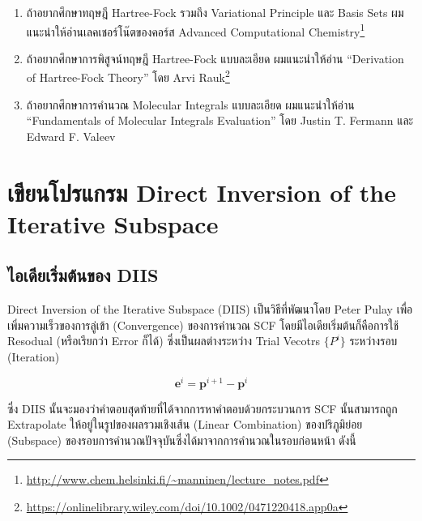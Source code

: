 \begin{enumerate}[topsep=0pt,noitemsep]
  \setlength\itemsep{1em}
  \item ถ้าอยากศึกษาทฤษฎี Hartree-Fock รวมถึง Variational Principle และ Basis Sets ผมแนะนำให้อ่านเลคเชอร์โน๊ตของคอร์ส
        Advanced Computational Chemistry\footnote{\url{http://www.chem.helsinki.fi/~manninen/lecture_notes.pdf}}

  \item ถ้าอยากศึกษาการพิสูจน์ทฤษฎี Hartree-Fock แบบละเอียด ผมแนะนำให้อ่าน \enquote{Derivation of Hartree-Fock Theory}
        โดย Arvi Rauk\footnote{\url{https://onlinelibrary.wiley.com/doi/10.1002/0471220418.app0a}}

  \item ถ้าอยากศึกษาการคำนวณ Molecular Integrals แบบละเอียด ผมแนะนำให้อ่าน \enquote{Fundamentals of Molecular
          Integrals Evaluation} โดย Justin T. Fermann และ Edward F. Valeev
\end{enumerate}

\section{เขียนโปรแกรม Direct Inversion of the Iterative Subspace}

\subsection{ไอเดียเริ่มต้นของ DIIS}

Direct Inversion of the Iterative Subspace (DIIS) เป็นวิธีที่พัฒนาโดย Peter Pulay เพื่อเพิ่มความเร็วของการลู่เข้า (Convergence)
ของการคำนวณ SCF\autocite{pulay1980} โดยมีไอเดียเริ่มต้นก็คือการใช้ Resodual (หรือเรียกว่า Error ก็ได้) ซึ่งเป็นผลต่างระหว่าง
Trial Vecotrs $\{ P^{i}\}$ ระหว่างรอบ (Iteration)

\begin{equation}
  \mathbf{e}^i
  =
  \mathbf{p}^{i+1} - \mathbf{p}^i
\end{equation}

\noindent ซึ่ง DIIS นั้นจะมองว่าคำตอบสุดท้ายที่ได้จากการหาคำตอบด้วยกระบวนการ SCF นั้นสามารถถูก Extrapolate ให้อยู่ในรูปของผลรวมเชิงเส้น
(Linear Combination) ของปริภูมิย่อย (Subspace) ของรอบการคำนวณปัจจุบันซึ่งได้มาจากการคำนวณในรอบก่อนหน้า ดังนี้

